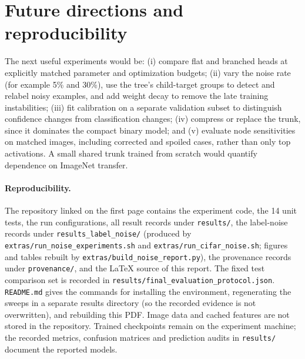 \documentclass[11pt,a4paper]{article}
\begin{document}
\section{Future directions and reproducibility}
The next useful experiments would be: (i) compare flat and branched heads at explicitly matched parameter and optimization budgets; (ii) vary the noise rate (for example 5\% and 30\%), use the tree's child-target groups to detect and relabel noisy examples, and add weight decay to remove the late training instabilities; (iii) fit calibration on a separate validation subset to distinguish confidence changes from classification changes; (iv) compress or replace the trunk, since it dominates the compact binary model; and (v) evaluate node sensitivities on matched images, including corrected and spoiled cases, rather than only top activations. A small shared trunk trained from scratch would quantify dependence on ImageNet transfer.

\paragraph{Reproducibility.} The repository linked on the first page contains the experiment code, the 14 unit tests, the run configurations, all result records under \texttt{results/}, the label-noise records under \texttt{results\_label\_noise/} (produced by \texttt{extras/run\_noise\_experiments.sh} and \texttt{extras/run\_cifar\_noise.sh}; figures and tables rebuilt by \texttt{extras/build\_noise\_report.py}), the provenance records under \texttt{provenance/}, and the LaTeX source of this report. The fixed test comparison set is recorded in \texttt{results/final\_evaluation\_protocol.json}. \texttt{README.md} gives the commands for installing the environment, regenerating the sweeps in a separate results directory (so the recorded evidence is not overwritten), and rebuilding this PDF. Image data and cached features are not stored in the repository. Trained checkpoints remain on the experiment machine; the recorded metrics, confusion matrices and prediction audits in \texttt{results/} document the reported models.
\end{document}
